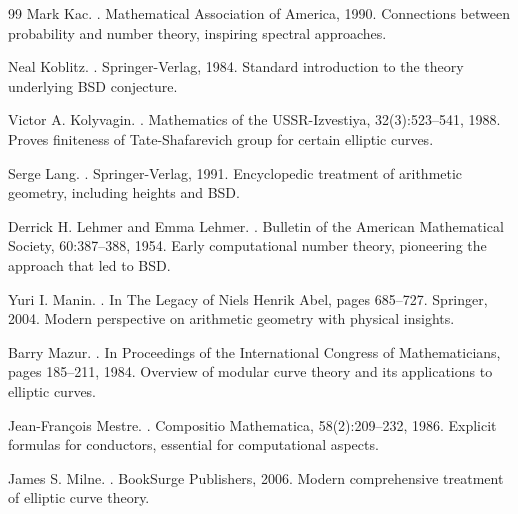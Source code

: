 \documentclass[12pt]{article}
\begin{document}
\begin{thebibliography}{99}
Mark Kac.
.
\newblock Mathematical Association of America, 1990.
\newblock Connections between probability and number theory, inspiring spectral approaches.

Neal Koblitz.
.
\newblock Springer-Verlag, 1984.
\newblock Standard introduction to the theory underlying BSD conjecture.

Victor A. Kolyvagin.
.
\newblock Mathematics of the USSR-Izvestiya, 32(3):523--541, 1988.
\newblock Proves finiteness of Tate-Shafarevich group for certain elliptic curves.

Serge Lang.
.
\newblock Springer-Verlag, 1991.
\newblock Encyclopedic treatment of arithmetic geometry, including heights and BSD.

Derrick H. Lehmer and Emma Lehmer.
.
\newblock Bulletin of the American Mathematical Society, 60:387--388, 1954.
\newblock Early computational number theory, pioneering the approach that led to BSD.

Yuri I. Manin.
.
\newblock In The Legacy of Niels Henrik Abel, pages 685--727. Springer, 2004.
\newblock Modern perspective on arithmetic geometry with physical insights.

Barry Mazur.
.
\newblock In Proceedings of the International Congress of Mathematicians, pages 185--211, 1984.
\newblock Overview of modular curve theory and its applications to elliptic curves.

Jean-François Mestre.
.
\newblock Compositio Mathematica, 58(2):209--232, 1986.
\newblock Explicit formulas for conductors, essential for computational aspects.

James S. Milne.
.
\newblock BookSurge Publishers, 2006.
\newblock Modern comprehensive treatment of elliptic curve theory.


\end{thebibliography}
\end{document}

